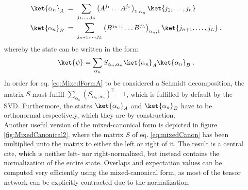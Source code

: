 \begin{align}
 	\ket{\alpha_n}_A \; &= \; \sum_{j_1 , \ldots , j_n} \left( A^{j_1} \ldots A^{j_n} \right)_{1,\alpha_n} \ket{j_1 , \ldots , j_n}  \label{eq:mixedA} \\
 	\ket{\alpha_n}_B \; &= \; \sum_{j_{n+1} , \ldots , j_L} \left( B^{j_{n+1}} \ldots B^{j_L} \right)_{\alpha_n , 1} \ket{j_{n+1} , \ldots , j_L} \; , \label{eq:mixedB}
\end{align}
whereby the state can be written in the form
\begin{equation}
	\ket{\psi} = \sum_{\alpha_n} S_{\alpha_n , \alpha_n} \ket{\alpha_n}_A \ket{\alpha_n}_B \; . \label{eq:MixedFormA}
\end{equation}
In order for eq. \eqref{eq:MixedFormA} to be considered a Schmidt decomposition, the matrix $S$ must fulfill $\sum_{\alpha_n} (S_{\alpha_n , \alpha_n})^2 = 1$, which is fulfilled by default by the SVD. Furthermore, the states $\ket{\alpha_n}_A$ and $\ket{\alpha_n}_B$ have to be orthonormal respectively, which they are by construction.\\
Another useful version of the mixed-canonical form is depicted in figure \ref{fig:MixedCanonical2}, where the matrix $S$ of eq. \eqref{eq:mixedCanon} has been multiplied unto the matrix to either the left or right of it. The result is a central cite, which is neither left- nor right-normalized, but instead contains the normalization of the entire state. Overlaps and expectation values can be computed very efficiently using the mixed-canonical form, as most of the tensor network can be explicitly contracted due to the normalization. 
 

